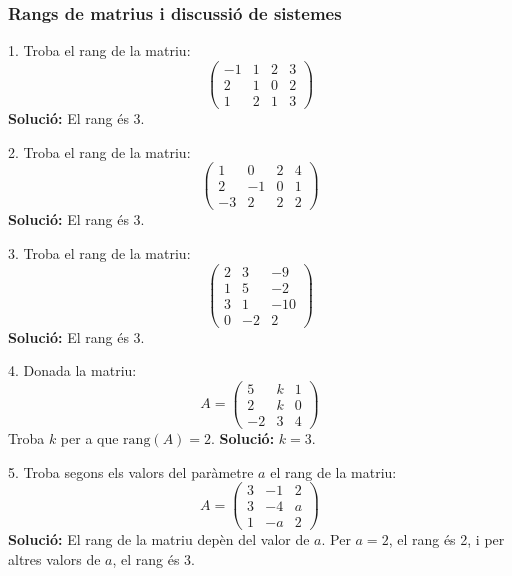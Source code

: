 \documentclass[12pt]{article}
\begin{document}
\subsubsection*{Rangs de matrius i discussió de sistemes}

\begin{exercici}
1. Troba el rang de la matriu:
\[
\begin{pmatrix}
-1 & 1 & 2 & 3 \\
2 & 1 & 0 & 2 \\
1 & 2 & 1 & 3
\end{pmatrix}
\]
\textbf{Solució:} El rang és 3.
\end{exercici}

\begin{exercici}
2. Troba el rang de la matriu:
\[
\begin{pmatrix}
1 & 0 & 2 & 4 \\
2 & -1 & 0 & 1 \\
-3 & 2 & 2 & 2
\end{pmatrix}
\]
\textbf{Solució:} El rang és 3.
\end{exercici}

\begin{exercici}
3. Troba el rang de la matriu:
\[
\begin{pmatrix}
2 & 3 & -9 \\
1 & 5 & -2 \\
3 & 1 & -10 \\
0 & -2 & 2
\end{pmatrix}
\]
\textbf{Solució:} El rang és 3.
\end{exercici}

\begin{exercici}
4. Donada la matriu:
\[
A =
\begin{pmatrix}
5 & k & 1 \\
2 & k & 0 \\
-2 & 3 & 4
\end{pmatrix}
\]
Troba \(k\) per a que \(\text{rang}(A) = 2\).
\textbf{Solució:} \( k = 3 \).
\end{exercici}

\begin{exercici}
5. Troba segons els valors del paràmetre \(a\) el rang de la matriu:
\[
A =
\begin{pmatrix}
3 & -1 & 2 \\
3 & -4 & a \\
1 & -a & 2
\end{pmatrix}
\]
\textbf{Solució:} El rang de la matriu depèn del valor de \(a\). Per \(a = 2\), el rang és 2, i per altres valors de \(a\), el rang és 3.
\end{exercici}
\end{document}
